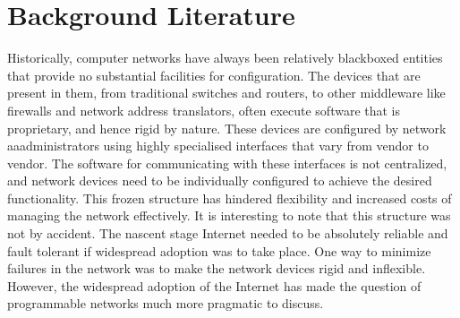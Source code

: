 
\chapter{Background Literature} %

\label{Chapter2} %



Historically, computer networks have always been relatively blackboxed entities that provide no substantial
facilities for configuration. The devices that are present in them, from traditional switches and routers, to other
middleware like firewalls and network address translators, often execute software that is proprietary, and hence
rigid by nature.
\newline
These devices are configured by network aaadministrators using highly specialised interfaces that vary from vendor to 
vendor. The software for communicating with these interfaces is not centralized, and network devices need to be
individually configured to achieve the desired functionality. This frozen structure has hindered flexibility and
increased costs of managing the network effectively.
\newline
It is interesting to note that this structure was not by accident. The nascent stage Internet needed to be absolutely
reliable and fault tolerant if widespread adoption was to take place. One way to minimize failures in the network was
to make the network devices rigid and inflexible. However, the widespread adoption of the
Internet has made the question of programmable networks much more pragmatic to discuss.

